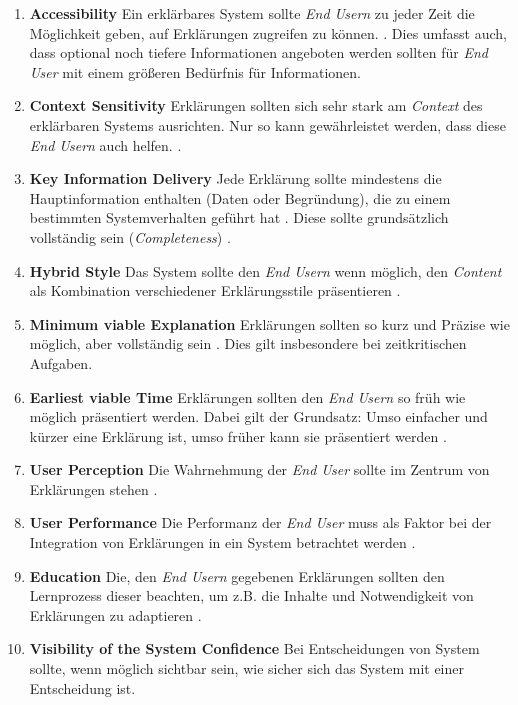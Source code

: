 \begin{enumerate}
    \item \textbf{Accessibility} Ein erklärbares System sollte \textit{End Usern} zu jeder Zeit die Möglichkeit geben, auf Erklärungen zugreifen zu können. \cite{wiegand2019drive, chazette_end-users_nodate, wiegand_id_2020, weitz_you_2019}. Dies umfasst auch, dass optional noch tiefere Informationen angeboten werden sollten für \textit{End User} mit einem größeren Bedürfnis für Informationen. \cite{martin_evaluating_2021}
    \item \textbf{Context Sensitivity} Erklärungen sollten sich sehr stark am \textit{Context} des erklärbaren Systems ausrichten. Nur so kann gewährleistet werden, dass diese \textit{End Usern} auch helfen. \cite{sato_context_nodate, rjoob_towards_2021,chazette_end-users_nodate}.
    \item \textbf{Key Information Delivery} Jede Erklärung sollte mindestens die Hauptinformation enthalten (Daten oder Begründung), die zu einem bestimmten Systemverhalten geführt hat \cite{martin_evaluating_2021}. Diese sollte grundsätzlich vollständig sein (\textit{Completeness}) \cite{riveiro_thats_2021}.
    \item \textbf{Hybrid Style} Das System sollte den \textit{End Usern} wenn möglich, den \textit{Content} als Kombination verschiedener Erklärungsstile präsentieren \cite{sato_action-triggering_2019, kunkel_let_2019, sato_action-triggering_2019, schrills_color_2020, lim_2009_assessing}.
    \item \textbf{Minimum viable Explanation} Erklärungen sollten so kurz und Präzise wie möglich, aber vollständig sein \cite{wiegand_id_2020, wiegand2019drive}. Dies gilt insbesondere bei zeitkritischen Aufgaben.
    \item \textbf{Earliest viable Time} Erklärungen sollten den \textit{End Usern} so früh wie möglich präsentiert werden. Dabei gilt der Grundsatz: Umso einfacher und kürzer eine Erklärung ist, umso früher kann sie präsentiert werden \cite{hleg2019policy, sovrano_modelling_2020}.
    \item \textbf{User Perception} Die Wahrnehmung der \textit{End User} sollte im Zentrum von Erklärungen stehen \cite{riveiro_thats_2021}.
    \item \textbf{User Performance} Die Performanz der \textit{End User} muss als Faktor bei der Integration von Erklärungen in ein System betrachtet werden \cite{riveiro_thats_2021}.
    \item \textbf{Education} Die, den \textit{End Usern} gegebenen Erklärungen sollten den Lernprozess dieser beachten, um z.B. die Inhalte und Notwendigkeit von Erklärungen zu adaptieren \cite{wang_integration_2020}.
    \item \textbf{Visibility of the System Confidence} Bei Entscheidungen von System sollte, wenn möglich sichtbar sein, wie sicher sich das System mit einer Entscheidung ist. \cite{wiegand_id_2020, golledge1999wayfinding}
\end{enumerate}

